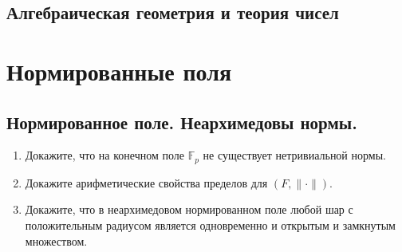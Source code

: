 \documentclass[11pt]{article}
\begin{document}
\begin{center}
        \section*{Алгебраическая геометрия и теория чисел}
    \end{center}
    \tableofcontents
    \newpage

    \section{Нормированные поля}
    \subsection{Нормированное поле. Неархимедовы нормы.}
    \begin{enumerate}
        \item Докажите, что на конечном поле $\mathbb{F}_{p}$ не существует нетривиальной нормы.

        \item Докажите арифметические свойства пределов для $(F, \| \cdot \|)$.

        \item Докажите, что в неархимедовом нормированном поле любой шар с положительным радиусом является одновременно и открытым
              и замкнутым множеством.
    \end{enumerate}
\end{document}
